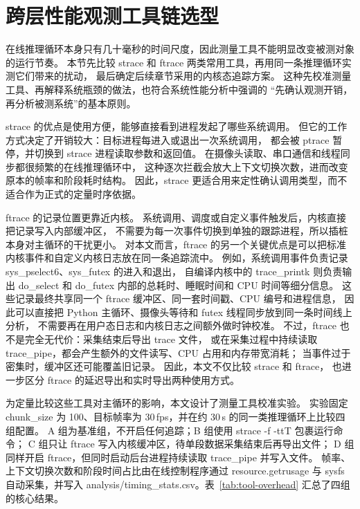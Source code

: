 \section{跨层性能观测工具链选型}\label{sec:tool-selection}

在线推理循环本身只有几十毫秒的时间尺度，因此测量工具不能明显改变被测对象的运行节奏。
本节先比较 strace 和 ftrace 两类常用工具，再用同一条推理循环实测它们带来的扰动，
最后确定后续章节采用的内核态追踪方案。
这种先校准测量工具、再解释系统瓶颈的做法，也符合系统性能分析中强调的
“先确认观测开销，再分析被测系统”的基本原则。

strace\cite{strace} 的优点是使用方便，能够直接看到进程发起了哪些系统调用。
但它的工作方式决定了开销较大：目标进程每进入或退出一次系统调用，
都会被 ptrace 暂停，并切换到 strace 进程读取参数和返回值。
在摄像头读取、串口通信和线程同步都很频繁的在线推理循环中，
这种逐次拦截会放大上下文切换次数，进而改变原本的帧率和阶段耗时结构。
因此，strace 更适合用来定性确认调用类型，而不适合作为正式的定量时序依据。

ftrace\cite{ftrace} 的记录位置更靠近内核。
系统调用、调度或自定义事件触发后，内核直接把记录写入内部缓冲区，
不需要为每一次事件切换到单独的跟踪进程，所以插桩本身对主循环的干扰更小。
对本文而言，ftrace 的另一个关键优点是可以把标准内核事件和自定义内核日志放在同一条追踪流中。
例如，系统调用事件负责记录 sys\_pselect6、sys\_futex 的进入和退出，
自编译内核中的 trace\_printk 则负责输出 do\_select 和
do\_futex 内部的总耗时、睡眠时间和 CPU 时间等细分信息。
这些记录最终共享同一个 ftrace 缓冲区、同一套时间戳、CPU 编号和进程信息，
因此可以直接把 Python 主循环、摄像头等待和 futex 线程同步放到同一条时间线上分析，
不需要再在用户态日志和内核日志之间额外做时钟校准。
不过，ftrace 也不是完全无代价：采集结束后导出 trace 文件，
或在采集过程中持续读取 trace\_pipe，都会产生额外的文件读写、CPU 占用和内存带宽消耗；
当事件过于密集时，缓冲区还可能覆盖旧记录。
因此，本文不仅比较 strace 和 ftrace，
也进一步区分 ftrace 的延迟导出和实时导出两种使用方式。

为定量比较这些工具对主循环的影响，本文设计了测量工具校准实验。
实验固定 chunk\_size 为 100、目标帧率为 30\,fps，并在约 30\,s 的同一类推理循环上比较四组配置。
A 组为基准组，不开启任何追踪；B 组使用 strace -f -ttT 包裹运行命令；
C 组只让 ftrace 写入内核缓冲区，待单段数据采集结束后再导出文件；
D 组同样开启 ftrace，但同时启动后台进程持续读取 trace\_pipe 并写入文件。
帧率、上下文切换次数和阶段时间占比由在线控制程序通过
resource.getrusage 与 sysfs 自动采集，并写入
analysis/timing\_stats.csv。表~\ref{tab:tool-overhead} 汇总了四组的核心结果。

